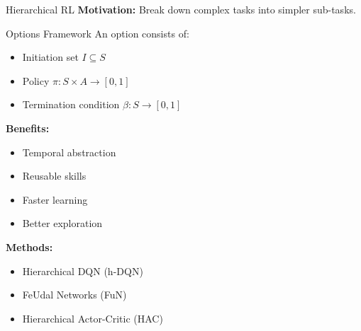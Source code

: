 \documentclass[aspectratio=169]{beamer}
\begin{document}
\begin{frame}{Hierarchical RL}
  \textbf{Motivation:} Break down complex tasks into simpler sub-tasks.

  \vspace{0.5em}

  \begin{definitionbox}{Options Framework}
    An option consists of:
    \begin{itemize}
      \item Initiation set $I \subseteq S$
      \item Policy $\pi: S \times A \to [0,1]$
      \item Termination condition $\beta: S \to [0,1]$
    \end{itemize}
  \end{definitionbox}

  \vspace{0.5em}

  \textbf{Benefits:}
  \begin{itemize}
    \item Temporal abstraction
    \item Reusable skills
    \item Faster learning
    \item Better exploration
  \end{itemize}

  \vspace{0.5em}

  \textbf{Methods:}
  \begin{itemize}
    \item Hierarchical DQN (h-DQN)
    \item FeUdal Networks (FuN)
    \item Hierarchical Actor-Critic (HAC)
  \end{itemize}
\end{frame}
\end{document}
